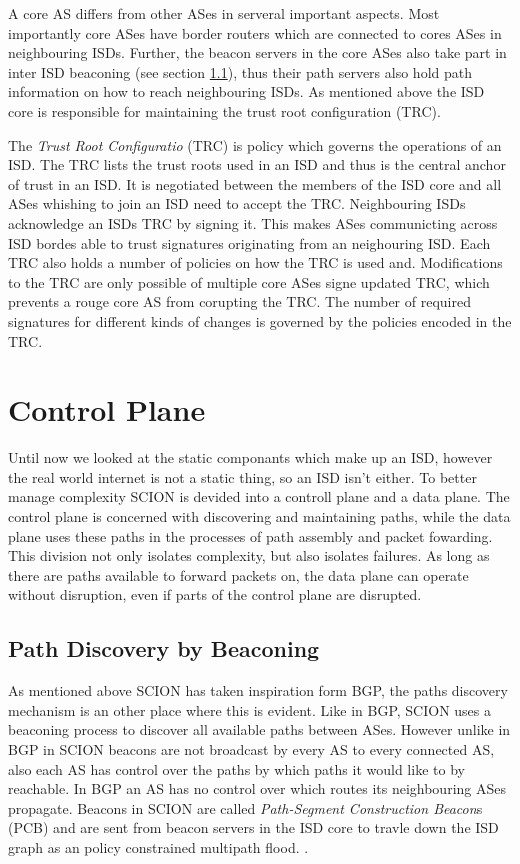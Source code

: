 \documentclass[../eva1_scion.tex]{subfiles}
\begin{document}
    A core AS differs from other ASes in serveral important aspects. Most importantly core ASes have border routers which are connected to cores ASes in neighbouring ISDs. Further, the beacon servers in the core ASes also take part in inter ISD beaconing (see section \ref{ssec:beaconing}), thus their path servers also hold path information on how to reach neighbouring ISDs. As mentioned above the ISD core is responsible for maintaining the trust root configuration (TRC).

    The \textit{Trust Root Configuratio} (TRC) is policy which governs the operations of an ISD. The TRC lists the trust roots used in an ISD and thus is the central anchor of trust in an ISD. It is negotiated between the members of the ISD core and all ASes whishing to join an ISD need to accept the TRC. Neighbouring ISDs acknowledge an ISDs TRC by signing it. This makes ASes communicting across ISD bordes able to trust signatures originating from an neighouring ISD. Each TRC also holds a number of policies on how the TRC is used and. Modifications to the TRC are only possible of multiple core ASes signe updated TRC, which prevents a rouge core AS from corupting the TRC. The number of required signatures for different kinds of changes is governed by the policies encoded in the TRC.

    \section{Control Plane}
    Until now we looked at the static componants which make up an ISD, however the real world internet is not a static thing, so an ISD isn't either. To better manage complexity SCION is devided into a controll plane and a data plane. The control plane is concerned with discovering and maintaining paths, while the data plane uses these paths in the processes of path assembly and packet fowarding. This division not only isolates complexity, but also isolates failures. As long as there are paths available to forward packets on, the data plane can operate without disruption, even if parts of the control plane are disrupted.

    \subsection{Path Discovery by Beaconing}\label{ssec:beaconing}
    As mentioned above SCION has taken inspiration form BGP, the paths discovery mechanism is an other place where this is evident. Like in BGP, SCION uses a beaconing process to discover all available paths between ASes. However unlike in BGP in SCION beacons are not broadcast by every AS to every connected AS, also each AS has control over the paths by which paths it would like to by reachable. In BGP an AS has no control over which routes its neighbouring ASes propagate. Beacons in SCION are called \textit{Path-Segment Construction Beacon}s (PCB) and are  sent from beacon servers in the ISD core to travle down the ISD graph as an policy constrained multipath flood. \cite{scion_2011}.
\end{document}
